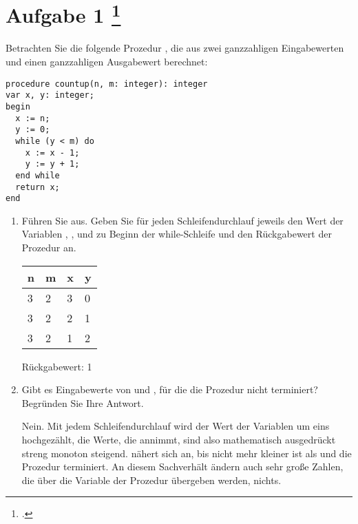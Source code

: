 \documentclass{lehramt-informatik-aufgabe}
\begin{document}

\section{Aufgabe 1
\footcite{66115:2020:09}}

Betrachten Sie die folgende Prozedur , die aus zwei
ganzzahligen Eingabewerten  und  einen ganzzahligen
Ausgabewert berechnet:

\begin{verbatim}
procedure countup(n, m: integer): integer
var x, y: integer;
begin
  x := n;
  y := 0;
  while (y < m) do
    x := x - 1;
    y := y + 1;
  end while
  return x;
end
\end{verbatim}
\begin{enumerate}


\item Führen Sie  aus. Geben Sie für jeden
Schleifendurchlauf jeweils den Wert der Variablen , , 
und  zu Beginn der while-Schleife und den Rückgabewert der Prozedur
an.

\begin{liAntwort}
\begin{tabular}{llll}
n & m & x & y \\\hline
3 & 2 & 3 & 0 \\
3 & 2 & 2 & 1 \\
3 & 2 & 1 & 2 \\
\end{tabular}

Rückgabewert: 1
\end{liAntwort}


\item Gibt es Eingabewerte von  und , für die die Prozedur
 nicht terminiert? Begründen Sie Ihre Antwort.

\begin{liAntwort}
Nein. Mit jedem Schleifendurchlauf wird der Wert der Variablen  um
eins hochgezählt, die Werte, die  annimmt, sind also mathematisch
ausgedrückt streng monoton steigend.  nähert sich 
an, bis  nicht mehr kleiner ist als  und die Prozedur
terminiert. An diesem Sachverhält ändern auch sehr große Zahlen, die
über die Variable  der Prozedur übergeben werden, nichts.
\end{liAntwort}


\end{enumerate}
\end{document}
